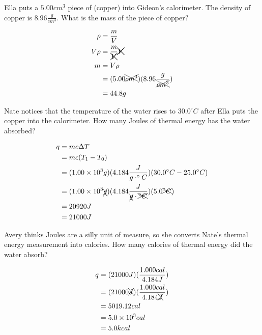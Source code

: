 \documentclass[11pt,addpoints]{exam}   	%
\begin{document}
\begin{questions}
\question[5] Ella puts a $5.00 cm^3$ piece of  (copper) into Gideon's calorimeter.  The density of copper is $8.96 \frac{g}{cm^{3}}$. What is the mass of the piece of copper?
\begin{solution}
\begin{equation} 
\begin{split}
   \rho &= \frac{m}{V} \\
   V \rho &= \frac{m}{\xcancel{V}} \xcancel{V} \\
   m &= V \rho \\     
       &= (5.00 \xcancel{cm^3})(8.96 \frac{g}{\xcancel{cm^3}}) \\
       &= 44.8 g                             
 \end{split}
 \end{equation}
 \end{solution}

\question[5] Nate notices that the temperature of the water rises to $30.0^{\circ}C$ after Ella puts the copper into the calorimeter. How many Joules of thermal energy has the water absorbed?
\begin{solution}
\begin{equation} 
\begin{split}
   q &= m c \Delta T \\
      &= m c (T_1 - T_0) \\
      &= (1.00 \times 10^3 g) (4.184 \frac{J}{g \cdot ^{\circ}C})(30.0 ^{\circ} C - 25.0 ^{\circ} C) \\
      &= (1.00 \times 10^3 \xcancel{g})(4.184 \frac{J}{\xcancel{g} \cdot \xcancel{^{\circ}C}}) (5.0 \xcancel{^{\circ} C}) \\
      &= 20920 J \\
      &= 21000 J                           
 \end{split}
 \end{equation}
 \end{solution}

\question[5] Avery thinks Joules are a silly unit of measure, so she converts Nate's thermal energy measurement into calories. How many calories of thermal energy did the water absorb?
\begin{solution}
\begin{equation} 
\begin{split}
   q &= (21000 J) (\frac{1.000 cal}{4.184 J}) \\
      &= (21000 \xcancel{J})(\frac{1.000 cal}{4.184 \xcancel{J}}) \\
      &= 5019.12 cal \\
      &= 5.0 \times 10^3 cal \\
      &= 5.0 kcal
 \end{split}
 \end{equation}
 \end{solution}


\end{questions}
\end{document}
